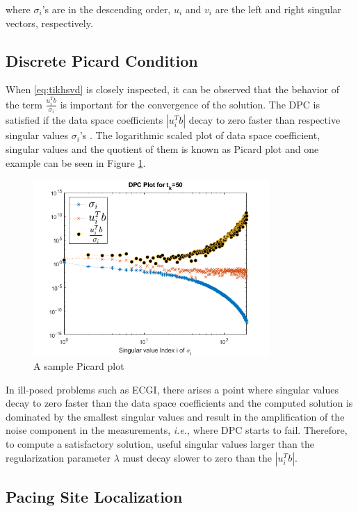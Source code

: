 \documentclass[draftcls, onecolumn, journal]{IEEEtran}
\begin{document}
where $\sigma_i$'s are in the descending order, $u_i$ and $v_i$ are the left and right singular vectors, respectively.

\subsection{Discrete Picard Condition} \label{subsec:DPC}

When \eqref{eq:tikhsvd} is closely inspected, it can be observed that the behavior of the term $\frac{u_i^Tb}{\sigma_i}$ is important for the convergence of the solution. The DPC is satisfied if the data space coefficients $|u_i^Tb|$ decay to zero faster than respective singular values $\sigma_i$'s \cite*{chamorro2017improving}. The logarithmic scaled plot of data space coefficient, singular values and the quotient of them is known as Picard plot and one example can be seen in Figure \ref*{fig:PicardPlot}.

\begin{figure}[h]
\centering
\includegraphics[width=0.8\textwidth]{../images/PicardPlot.png}
\caption{A sample Picard plot}\label{fig:PicardPlot}
\end{figure}

In ill-posed problems such as ECGI, there arises a point where singular values decay to zero faster than the data space coefficients and the computed solution is dominated by the smallest singular values and result in the amplification of the noise component in the measurements, \textit{i.e.}, where DPC starts to fail. Therefore, to compute a satisfactory solution, useful singular values larger than the regularization parameter $\lambda$ must decay slower to zero than the $|u_i^Tb|$.  

\subsection{Pacing Site Localization}
\end{document}
